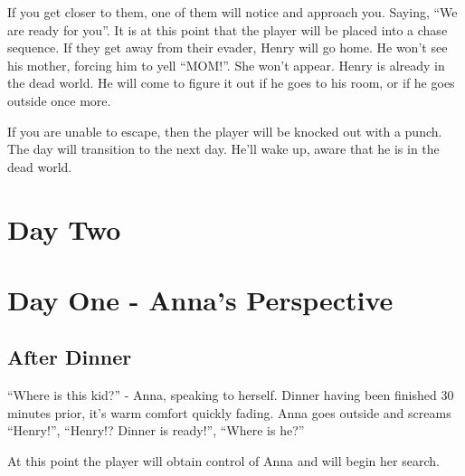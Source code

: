 \documentclass[12pt, a4paper, titlepage]{article}
\begin{document}
            If you get closer to them, one of them will notice and approach you. Saying, ``We are ready for you''. It is at this point that the player will be placed into a chase sequence. If they 
            get away from their evader, Henry will go home. He won't see his mother, forcing him to yell ``MOM!''. She won't appear. Henry is already in the dead world. He will come to figure 	it out if he goes to his room, or if he goes outside once more.
            
            If you are unable to escape, then the player will be knocked out with a punch. The day will transition to the next day. He'll wake up, aware that he is in the dead world.
            
    \section{Day Two}
    
    
    \section{Day One - Anna's Perspective}
    
    	\subsection{After Dinner}
		
		``Where is this kid?'' - Anna, speaking to herself. Dinner having been finished 30 minutes prior, it's warm comfort quickly fading.
		Anna goes outside and screams ``Henry!'', ``Henry!? Dinner is ready!'', ``Where is he?''
		
		At this point the player will obtain control of Anna and will begin her search.
\end{document}
